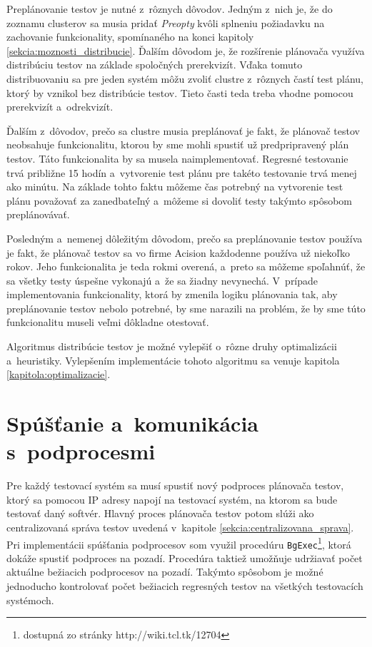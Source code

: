 Preplánovanie testov je nutné z~rôznych dôvodov. Jedným z~nich je, 
že do zoznamu clusterov sa musia pridať \textit{Preopty} kvôli splneniu 
požiadavku na zachovanie funkcionality, spomínaného na konci kapitoly 
\ref{sekcia:moznosti_distribucie}. 
Ďalším dôvodom je, že rozšírenie plánovača využíva distribúciu testov 
na základe spoločných prerekvizít. 
Vďaka tomuto distribuovaniu sa pre jeden systém môžu zvoliť clustre 
z~rôznych častí test plánu, ktorý by vznikol bez distribúcie testov.
Tieto časti teda treba vhodne  pomocou prerekvizít 
a~odrekvizít. 

Ďalším z~dôvodov, prečo sa clustre musia preplánovať je fakt, že 
plánovač testov neobsahuje funkcionalitu, ktorou by sme mohli spustiť 
už predpripravený plán testov. Táto funkcionalita by sa musela 
naimplementovať. Regresné testovanie trvá približne 15 hodín 
a~vytvorenie test plánu pre takéto testovanie trvá menej ako minútu.
Na základe tohto faktu môžeme čas potrebný na vytvorenie test plánu 
považovať za zanedbateľný a~môžeme si dovoliť testy takýmto spôsobom 
preplánovávať.

Posledným a~nemenej dôležitým dôvodom, prečo sa preplánovanie testov 
používa je fakt, že plánovač testov sa vo firme Acision každodenne 
používa už niekoľko rokov.
Jeho funkcionalita je teda rokmi overená, a~preto sa môžeme spoľahnúť, 
že sa všetky testy úspešne vykonajú a~že sa žiadny nevynechá.
V~prípade implementovania funkcionality, ktorá by zmenila logiku 
plánovania tak, aby preplánovanie testov nebolo potrebné, by sme narazili 
na problém, že by sme túto funkcionalitu museli veľmi dôkladne otestovať. 

Algoritmus distribúcie testov je možné vylepšiť o~rôzne druhy 
optimalizácii a~heuristiky. Vylepšením implementácie tohoto algoritmu 
sa venuje kapitola \ref{kapitola:optimalizacie}. 


\section{Spúšťanie a~komunikácia s~podprocesmi}
\label{sekcia:spustanie_podprocesov}
Pre každý testovací systém sa musí spustiť nový podproces plánovača 
testov, ktorý sa pomocou IP adresy napojí na testovací systém, 
na ktorom sa bude testovať daný softvér. Hlavný proces plánovača testov 
potom slúži ako centralizovaná správa testov uvedená
v~kapitole \ref{sekcia:centralizovana_sprava}.
Pri implementácii spúšťania podprocesov som využil procedúru 
\texttt{BgExec}\footnote{dostupná zo stránky http://wiki.tcl.tk/12704},
ktorá dokáže spustiť podproces na pozadí. Procedúra taktiež umožňuje 
udržiavať počet aktuálne bežiacich podprocesov na pozadí.
Takýmto spôsobom je možné jednoducho kontrolovať počet bežiacich 
regresných testov na všetkých testovacích systémoch.

